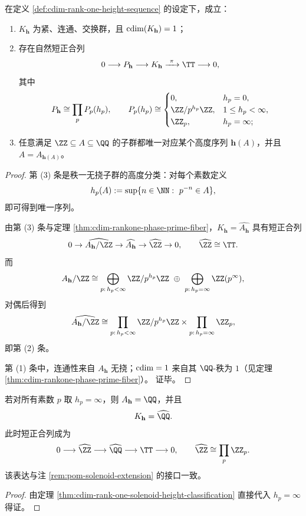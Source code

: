 \begin{theorem}\label{thm:cdim-rank-one-solenoid-height-classification}
在定义 \ref{def:cdim-rank-one-height-sequence} 的设定下，成立：
\begin{enumerate}
  \item \(K_{\mathbf h}\) 为紧、连通、交换群，且 \(\operatorname{cdim}(K_{\mathbf h})=1\)；
  \item 存在自然短正合列
  \[
  0\longrightarrow P_{\mathbf h}\longrightarrow K_{\mathbf h}\xrightarrow{\ \pi\ }\TT\longrightarrow 0,
  \]
  其中
  \[
  P_{\mathbf h}\cong \prod_{p} P_p(h_p),\qquad
  P_p(h_p)\cong
  \begin{cases}
  0,& h_p=0,\\
  \ZZ/p^{h_p}\ZZ,& 1\le h_p<\infty,\\
  \ZZ_p,& h_p=\infty;
  \end{cases}
  \]
  \item 任意满足 \(\ZZ\subseteq A\subseteq\QQ\) 的子群都唯一对应某个高度序列 \(\mathbf h(A)\)，并且 \(A=A_{\mathbf h(A)}\)。
\end{enumerate}
\end{theorem}
\begin{proof}
第 (3) 条是秩一无挠子群的高度分类：对每个素数定义
\[
h_p(A):=\sup\{n\in\NN:\ p^{-n}\in A\},
\]
即可得到唯一序列。
\par
由第 (3) 条与定理 \ref{thm:cdim-rankone-phase-prime-fiber}，\(K_{\mathbf h}=\widehat{A_{\mathbf h}}\) 具有短正合列
\[
0\to \widehat{A_{\mathbf h}/\ZZ}\to \widehat{A_{\mathbf h}}\to \widehat{\ZZ}\to 0,
\qquad
\widehat{\ZZ}\cong\TT.
\]
而
\[
A_{\mathbf h}/\ZZ
\cong
\bigoplus_{p:\,h_p<\infty}\ZZ/p^{h_p}\ZZ
\ \oplus\
\bigoplus_{p:\,h_p=\infty}\ZZ(p^\infty),
\]
对偶后得到
\[
\widehat{A_{\mathbf h}/\ZZ}
\cong
\prod_{p:\,h_p<\infty}\ZZ/p^{h_p}\ZZ
\times
\prod_{p:\,h_p=\infty}\ZZ_p,
\]
即第 (2) 条。
\par
第 (1) 条中，连通性来自 \(A_{\mathbf h}\) 无挠；\(\operatorname{cdim}=1\) 来自其 \(\QQ\)-秩为 \(1\)（见定理 \ref{thm:cdim-rankone-phase-prime-fiber}）。
证毕。
\end{proof}

\begin{corollary}[通用 solenoid 的全素数核]\label{cor:cdim-universal-solenoid-full-prime-kernel}
若对所有素数 \(p\) 取 \(h_p=\infty\)，则 \(A_{\mathbf h}=\QQ\)，并且
\[
K_{\mathbf h}=\widehat{\QQ}.
\]
此时短正合列成为
\[
0\longrightarrow \widehat{\ZZ}
\longrightarrow \widehat{\QQ}
\longrightarrow \TT
\longrightarrow 0,
\qquad
\widehat{\ZZ}\cong \prod_{p}\ZZ_p.
\]
该表达与注 \ref{rem:pom-solenoid-extension} 的接口一致。
\end{corollary}
\begin{proof}
由定理 \ref{thm:cdim-rank-one-solenoid-height-classification} 直接代入 \(h_p=\infty\) 得证。
\end{proof}

